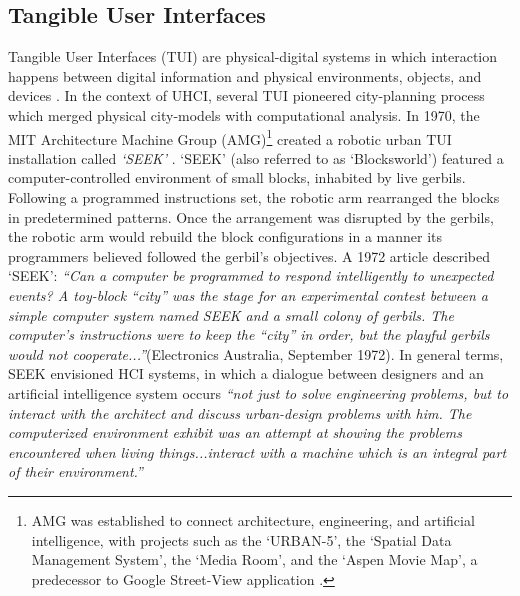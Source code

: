 {    \subsection{Tangible User Interfaces}
    {
        Tangible User Interfaces (TUI) are physical-digital systems in which interaction happens between digital information and physical environments, objects, and devices \cite{Ishii2008}. In the context of UHCI, several TUI pioneered city-planning process which merged physical city-models with computational analysis. In 1970, the MIT Architecture Machine Group (AMG)\footnote{AMG was established to connect architecture, engineering, and artificial intelligence, with projects such as the `URBAN-5', the `Spatial Data Management System', the `Media Room', and the `Aspen Movie Map', a predecessor to Google Street-View application \cite{negroponte1970architecture, negroponte1975soft}.} created a robotic urban TUI installation called \textit{`SEEK'} \cite{negroponte1975soft}. `SEEK' (also referred to as `Blocksworld') featured a computer-controlled environment of small blocks, inhabited by live gerbils. Following a programmed instructions set, the robotic arm rearranged the blocks in predetermined patterns. Once the arrangement was disrupted by the gerbils, the robotic arm would rebuild the block configurations in a manner its programmers believed followed the gerbil's objectives.
        \newline
        A 1972 article described `SEEK': \textit{``Can a computer be programmed to respond intelligently to unexpected events? A toy-block ``city'' was the stage for an experimental contest between a simple computer system named SEEK and a small colony of gerbils. The computer's instructions were to keep the ``city'' in order, but the playful gerbils would not cooperate...''}(Electronics Australia, September 1972). In general terms, SEEK envisioned HCI systems, in which a dialogue between designers and an artificial intelligence system occurs \textit{``not just to solve engineering problems, but to interact with the architect and discuss urban-design problems with him. The computerized environment exhibit was an attempt at showing the problems encountered when living things...interact with a machine which is an integral part of their environment.''} \cite{negroponte1975soft}

}}
